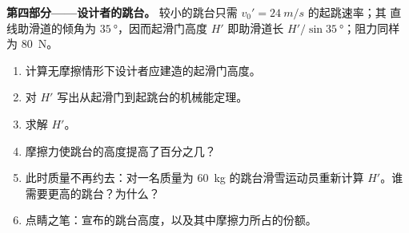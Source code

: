 \begin{problem}
\medskip\noindent\textbf{第四部分——设计者的跳台。}
较小的跳台只需 $v_0' = \qty{24}{m/s}$ 的起跳速率；其
直线助滑道的倾角为 $\qty{35}{\degree}$，因而起滑门高度 $H'$
即助滑道长 $H'/\sin\qty{35}{\degree}$；阻力同样为 \qty{80}{N}。
\begin{enumerate}[resume]
  \item 计算无摩擦情形下设计者应建造的起滑门高度。
  \item 对 $H'$ 写出从起滑门到起跳台的机械能定理。
  \item 求解 $H'$。
  \item 摩擦力使跳台的高度提高了百分之几？
  \item 此时质量不再约去：对一名质量为
        \qty{60}{kg} 的跳台滑雪运动员重新计算 $H'$。谁需要更高的跳台？为什么？
  \item 点睛之笔：宣布的跳台高度，以及其中摩擦力所占的份额。
\end{enumerate}
\end{problem}
